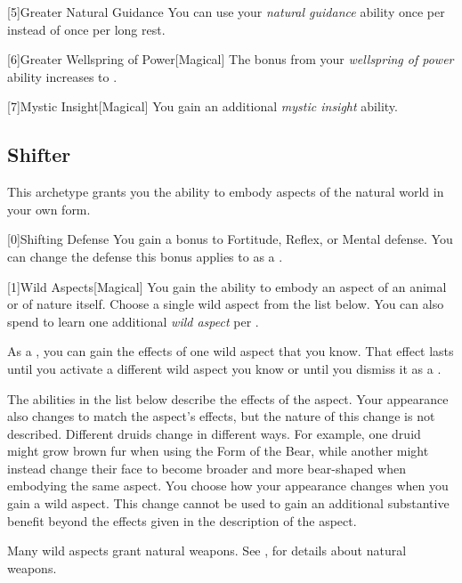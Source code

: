         [5]{Greater Natural Guidance} You can use your \textit{natural guidance} ability once per  instead of once per long rest.

        [6]{Greater Wellspring of Power}[Magical]
        The bonus from your \textit{wellspring of power} ability increases to .

        [7]{Mystic Insight}[Magical]
        You gain an additional \textit{mystic insight} ability.

    \newpage
    \subsection{Shifter}\label{Shifter}
        This archetype grants you the ability to embody aspects of the natural world in your own form.

        [0]{Shifting Defense} You gain a  bonus to Fortitude, Reflex, or Mental defense.
        You can change the defense this bonus applies to as a .

        [1]{Wild Aspects}[Magical]
        You gain the ability to embody an aspect of an animal or of nature itself.
        Choose a single wild aspect from the list below.
        You can also spend  to learn one additional \textit{wild aspect} per .

        As a , you can gain the effects of one wild aspect that you know.
        That effect lasts until you activate a different wild aspect you know or until you dismiss it as a .

        The abilities in the list below describe the effects of the aspect.
        Your appearance also changes to match the aspect's effects, but the nature of this change is not described.
        Different druids change in different ways.
        For example, one druid might grow brown fur when using the Form of the Bear, while another might instead change their face to become broader and more bear-shaped when embodying the same aspect.
        You choose how your appearance changes when you gain a wild aspect.
        This change cannot be used to gain an additional substantive benefit beyond the effects given in the description of the aspect.

        Many wild aspects grant natural weapons.
        See , for details about natural weapons.


